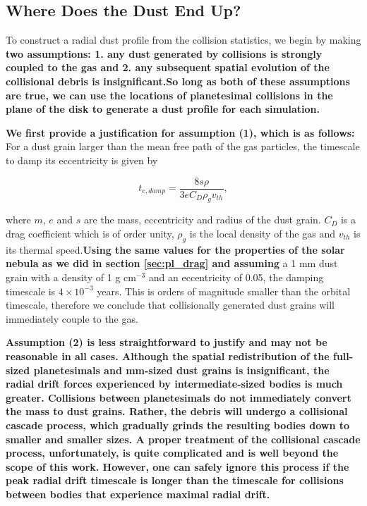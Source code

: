 \documentclass[fleqn,usenatbib]{mnras}
\begin{document}
\subsection{Where Does the Dust End Up?}\label{sec:dust}

To construct a radial dust profile from the collision statistics, we begin by making \textbf{two assumptions: 1. any dust generated by collisions is strongly coupled to the gas and 2. any subsequent spatial evolution of the collisional debris is insignificant.}\textbf{So long as both of these assumptions are true, we can use the locations of planetesimal collisions in the plane of the disk to generate a dust profile for each simulation.}

\textbf{We first provide a justification for assumption (1), which is as follows:} For a dust grain larger than the mean free path of the gas particles, the timescale to damp its eccentricity is given by \citep{1976PThPh..56.1756A}

\begin{equation}\label{eq:t_edamp}
    t_{e, damp} = \frac{8 s \rho}{3 e C_{D} \rho_{g} v_{th}},
\end{equation}

\noindent where $m$, $e$ and $s$ are the mass, eccentricity and radius of the dust grain. $C_{D}$ is a drag coefficient which is of order unity, $
\rho_{g}$ is the local density of the gas and $v_{th}$ is its thermal speed.\textbf{Using the same values for the properties of the solar nebula as we did in section \ref{sec:pl_drag} and assuming} a 1 mm dust grain with a 
density of 1 g cm$^{-3}$ and an eccentricity of 0.05, the damping timescale is $4 \times 10^{-3}$ years. This is orders of magnitude smaller than the 
orbital timescale, therefore we conclude that collisionally generated dust grains will immediately couple to the gas.

\textbf{Assumption (2) is less straightforward to justify and may not be reasonable in all cases. Although the spatial redistribution of the full-sized planetesimals and mm-sized dust grains is insignificant, the radial drift forces experienced by intermediate-sized bodies is much greater. Collisions between planetesimals do not immediately convert the mass to dust grains. Rather, the debris will undergo a collisional cascade process, which gradually grinds the resulting bodies down to smaller and smaller sizes. A proper treatment of the collisional cascade process, unfortunately, is quite complicated and is well beyond the scope of this work. However, one can safely ignore this process if the peak radial drift timescale is longer than the timescale for collisions between bodies that experience maximal radial drift.}
\end{document}
